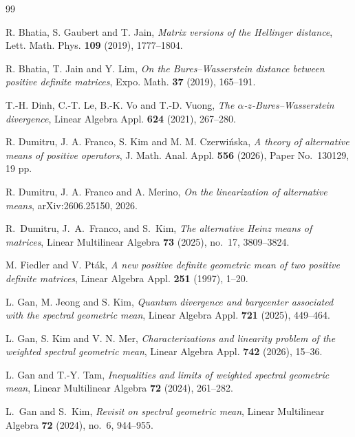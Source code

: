 \documentclass[11pt]{amsart}
\theoremstyle{definition}
\theoremstyle{remark}
\begin{document}
	\begin{thebibliography}{99}
		
		R. Bhatia, S. Gaubert and T. Jain,
		\emph{Matrix versions of the Hellinger distance},
		Lett. Math. Phys. \textbf{109} (2019), 1777--1804.
		
		R. Bhatia, T. Jain and Y. Lim,
		\emph{On the Bures--Wasserstein distance between positive definite matrices},
		Expo. Math. \textbf{37} (2019), 165--191.
		
		T.-H. Dinh, C.-T. Le, B.-K. Vo and T.-D. Vuong,
		\emph{The $\alpha$-$z$-Bures--Wasserstein divergence},
		Linear Algebra Appl. \textbf{624} (2021), 267--280.
	 
		
		R. Dumitru, J. A. Franco, S. Kim and M. M. Czerwi\'nska,
		\emph{A theory of alternative means of positive operators},
		J. Math. Anal. Appl. \textbf{556} (2026), Paper No.~130129, 19 pp.
		
		R. Dumitru, J. A. Franco and A. Merino,
		\emph{On the linearization of alternative means},
		arXiv:2606.25150, 2026.
		
		
		R.~Dumitru, J.~A.~Franco, and S.~Kim,
		\emph{The alternative Heinz means of matrices},
		Linear Multilinear Algebra \textbf{73} (2025), no.~17, 3809--3824.
		
		M. Fiedler and V. Pt\'ak,
		\emph{A new positive definite geometric mean of two positive definite
			matrices},
		Linear Algebra Appl. \textbf{251} (1997), 1--20.
	 
		
		L. Gan, M. Jeong and S. Kim,
		\emph{Quantum divergence and barycenter associated with the spectral
			geometric mean},
		Linear Algebra Appl. \textbf{721} (2025), 449--464.
	 
		
		L. Gan, S. Kim and V. N. Mer,
		\emph{Characterizations and linearity problem of the weighted spectral
			geometric mean},
		Linear Algebra Appl. \textbf{742} (2026), 15--36.
	 
		
		L. Gan and T.-Y. Tam,
		\emph{Inequalities and limits of weighted spectral geometric mean},
		Linear Multilinear Algebra \textbf{72} (2024), 261--282.
		
		L.~Gan and S.~Kim,
		\emph{Revisit on spectral geometric mean},
		Linear Multilinear Algebra \textbf{72} (2024), no.~6, 944--955.
		

\end{thebibliography}
\end{document}
